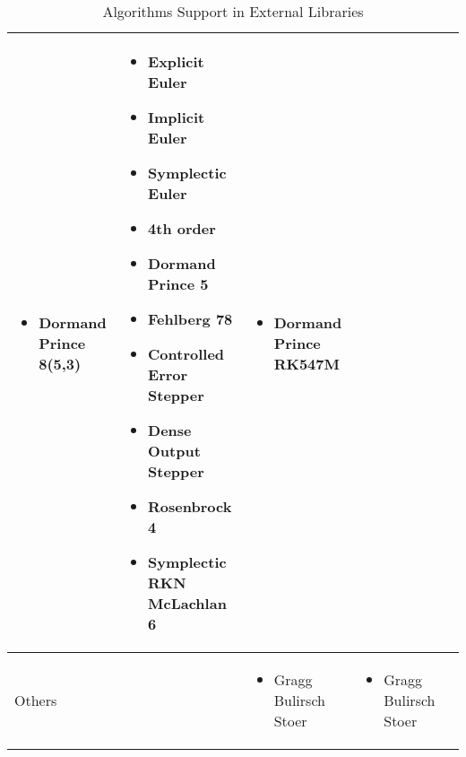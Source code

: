 \begin{sidewaystable}
\begin{adjustbox}{width=\columnwidth,center}
\begin{tabular}{p{} | p{} p{} p{} p{}}
\begin{itemize}[wide]
        \item Dormand Prince 8(5,3) 
        \end{itemize} & 
        \begin{itemize}[wide]
        \item Explicit Euler
        \item Implicit Euler
        \item Symplectic Euler
        \item 4th order
        \item Dormand Prince 5
        \item Fehlberg 78
        \item Controlled Error Stepper
        \item Dense Output Stepper
        \item Rosenbrock 4
        \item Symplectic RKN McLachlan 6
        \end{itemize} & 
        \begin{itemize}[wide]
        \item Dormand Prince RK547M
        \end{itemize} \\ \hline
    Others && 
        \begin{itemize}[wide]
        \item Gragg Bulirsch Stoer 
        \end{itemize} & 
        \begin{itemize}[wide]
        \item Gragg Bulirsch Stoer 
        \end{itemize} &\\
    \bottomrule	
\end{tabular}
\end{adjustbox}
\caption{Algorithms Support in External Libraries}	
\label{tab_algoexlib}
\end{sidewaystable}


